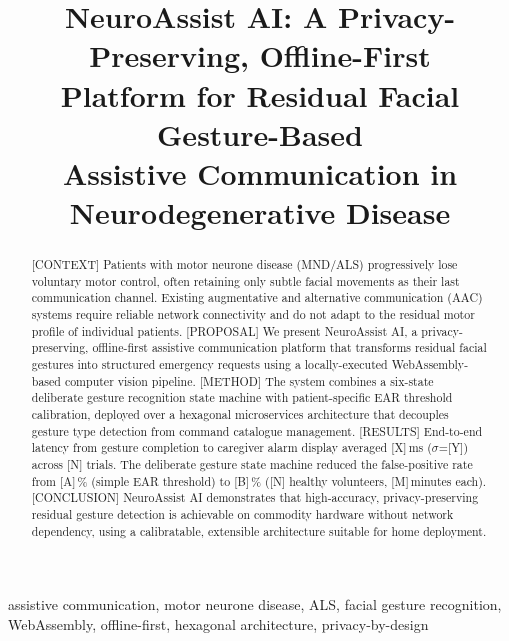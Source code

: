 \documentclass[conference]{IEEEtran}
\title{NeuroAssist AI: A Privacy-Preserving, Offline-First\\
Platform for Residual Facial Gesture-Based\\
Assistive Communication in\\
Neurodegenerative Disease}
\author{
  \IEEEauthorblockN{Danilo Amaral}
  \IEEEauthorblockA{TechLab AI\\
  cybernautta@gmail.com}
}
\begin{document}
\maketitle

\begin{abstract}
[CONTEXT] Patients with motor neurone disease (MND/ALS) progressively lose voluntary
motor control, often retaining only subtle facial movements as their last communication channel.
Existing augmentative and alternative communication (AAC) systems require reliable network
connectivity and do not adapt to the residual motor profile of individual patients.
[PROPOSAL] We present NeuroAssist AI, a privacy-preserving, offline-first assistive
communication platform that transforms residual facial gestures into structured emergency
requests using a locally-executed WebAssembly-based computer vision pipeline.
[METHOD] The system combines a six-state deliberate gesture recognition state machine
with patient-specific EAR threshold calibration, deployed over a hexagonal microservices
architecture that decouples gesture type detection from command catalogue management.
[RESULTS] End-to-end latency from gesture completion to caregiver alarm display
averaged [X]\,ms ($\sigma$=[Y]) across [N] trials.
The deliberate gesture state machine reduced the false-positive rate from [A]\,\%
(simple EAR threshold) to [B]\,\% ([N] healthy volunteers, [M]\,minutes each).
[CONCLUSION] NeuroAssist AI demonstrates that high-accuracy, privacy-preserving
residual gesture detection is achievable on commodity hardware without network
dependency, using a calibratable, extensible architecture suitable for home deployment.
\end{abstract}

\begin{IEEEkeywords}
assistive communication, motor neurone disease, ALS, facial gesture recognition,
WebAssembly, offline-first, hexagonal architecture, privacy-by-design
\end{IEEEkeywords}










\end{document}
